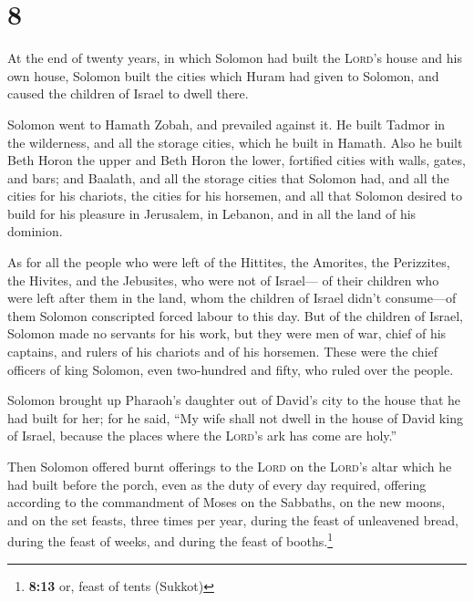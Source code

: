 \hypertarget{section-7}{%
\section{8}\label{section-7}}

 At the end of twenty years, in which Solomon had built
the \textsc{Lord}'s house and his own house,  Solomon
built the cities which Huram had given to Solomon, and caused the
children of Israel to dwell there.

 Solomon went to Hamath Zobah, and prevailed against it.
 He built Tadmor in the wilderness, and all the storage
cities, which he built in Hamath.  Also he built Beth
Horon the upper and Beth Horon the lower, fortified cities with walls,
gates, and bars;  and Baalath, and all the storage cities
that Solomon had, and all the cities for his chariots, the cities for
his horsemen, and all that Solomon desired to build for his pleasure in
Jerusalem, in Lebanon, and in all the land of his dominion.

 As for all the people who were left of the Hittites, the
Amorites, the Perizzites, the Hivites, and the Jebusites, who were not
of Israel---  of their children who were left after them
in the land, whom the children of Israel didn't consume---of them
Solomon conscripted forced labour to this day.  But of the
children of Israel, Solomon made no servants for his work, but they were
men of war, chief of his captains, and rulers of his chariots and of his
horsemen.  These were the chief officers of king Solomon,
even two-hundred and fifty, who ruled over the people.

 Solomon brought up Pharaoh's daughter out of David's
city to the house that he had built for her; for he said, ``My wife
shall not dwell in the house of David king of Israel, because the places
where the \textsc{Lord}'s ark has come are holy.''

 Then Solomon offered burnt offerings to the
\textsc{Lord} on the \textsc{Lord}'s altar which he had built before the
porch,  even as the duty of every day required, offering
according to the commandment of Moses on the Sabbaths, on the new moons,
and on the set feasts, three times per year, during the feast of
unleavened bread, during the feast of weeks, and during the feast of
booths.\footnote{\textbf{8:13} or, feast of tents (Sukkot)}

